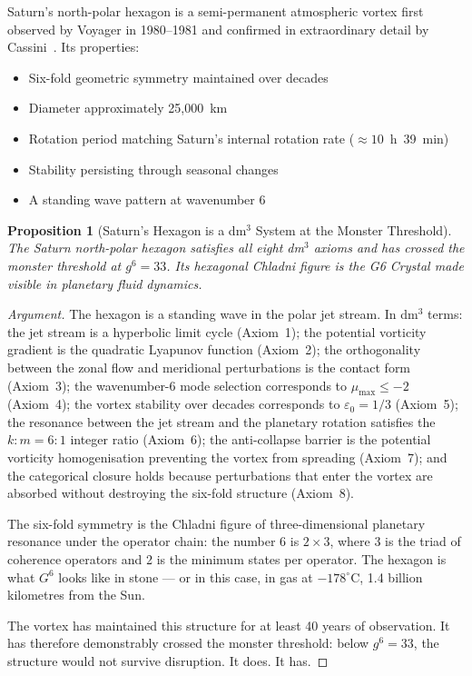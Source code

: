 \documentclass[11pt]{article}
\theoremstyle{plain}
\newtheorem{proposition}{Proposition}
\theoremstyle{definition}
\begin{document}
Saturn's north-polar hexagon is a semi-permanent atmospheric vortex
first observed by Voyager in 1980--1981 and confirmed in extraordinary
detail by Cassini~\cite{baines2009,fletcher2018}. Its properties:
\begin{itemize}[leftmargin=*, itemsep=2pt]
  \item Six-fold geometric symmetry maintained over decades
  \item Diameter approximately 25,000~km
  \item Rotation period matching Saturn's internal rotation rate
    ($\approx 10$~h~39~min)
  \item Stability persisting through seasonal changes
  \item A standing wave pattern at wavenumber 6
\end{itemize}

\begin{proposition}[Saturn's Hexagon is a dm$^3$ System at the Monster
Threshold]
The Saturn north-polar hexagon satisfies all eight dm$^3$ axioms and
has crossed the monster threshold at $g^6 = 33$. Its hexagonal Chladni
figure is the G6 Crystal made visible in planetary fluid dynamics.
\end{proposition}

\begin{proof}[Argument]
The hexagon is a standing wave in the polar jet stream. In dm$^3$
terms: the jet stream is a hyperbolic limit cycle (Axiom~1); the
potential vorticity gradient is the quadratic Lyapunov function
(Axiom~2); the orthogonality between the zonal flow and meridional
perturbations is the contact form (Axiom~3); the wavenumber-6 mode
selection corresponds to $\mu_{\max} \le -2$ (Axiom~4); the vortex
stability over decades corresponds to $\varepsilon_0 = 1/3$ (Axiom~5);
the resonance between the jet stream and the planetary rotation
satisfies the $k:m = 6:1$ integer ratio (Axiom~6); the anti-collapse
barrier is the potential vorticity homogenisation preventing the vortex
from spreading (Axiom~7); and the categorical closure holds because
perturbations that enter the vortex are absorbed without destroying the
six-fold structure (Axiom~8).

The six-fold symmetry is the Chladni figure of three-dimensional
planetary resonance under the operator chain: the number 6 is $2 \times 3$,
where 3 is the triad of coherence operators and 2 is the minimum
states per operator. The hexagon is what $G^6$ looks like in stone ---
or in this case, in gas at $-178^\circ$C, 1.4 billion kilometres from
the Sun.

The vortex has maintained this structure for at least 40 years of
observation. It has therefore demonstrably crossed the monster
threshold: below $g^6 = 33$, the structure would not survive
disruption. It does. It has.
\end{proof}
\end{document}
